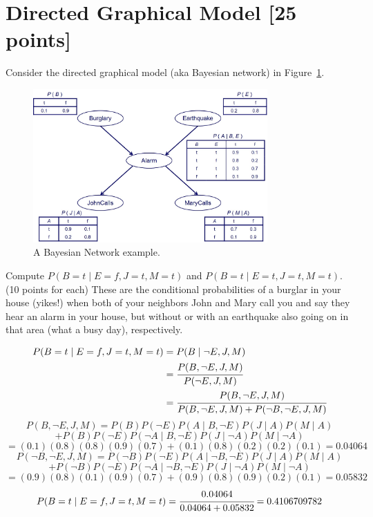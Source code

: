 \documentclass[a4paper]{article}
\theoremstyle{definition}
\newenvironment{soln}{
	\leavevmode\color{blue}\ignorespaces
}{}
\begin{document}
\section{Directed Graphical Model [25 points]}
Consider the directed graphical model (aka Bayesian network) in Figure~\ref{fig:bn}.
\begin{figure}[H]
    \centering
    \includegraphics[width=0.8\textwidth]{BN.jpeg}
    \caption{A Bayesian Network example.}
    \label{fig:bn}
\end{figure}
Compute $P(B=t \mid E=f,J=t,M=t)$ and $P(B=t \mid E=t,J=t,M=t)$. (10 points for each) These are the conditional probabilities of a burglar in your house (yikes!) when both of your neighbors John and Mary call you and say they hear an alarm in your house, but without or with an earthquake also going on in that area (what a busy day), respectively.

\begin{soln}
\begin{equation*}
\begin{split}
P(B=t \mid E=f,J=t,M=t) &= P(B \mid \neg E,J,M) \\
&= \cfrac{P(B, \neg E, J, M)}{P(\neg E, J, M)} \\
&= \cfrac{P(B, \neg E, J, M)}{P(B, \neg E, J, M) + P(\neg B, \neg E, J, M)} \\
\end{split}
\end{equation*}
$$P(B, \neg E, J, M) = P(B)P(\neg E) P(A \mid B, \neg E)P(J \mid A)P(M \mid A)$$
$$+ P(B)P(\neg E) P(\neg A \mid B, \neg E)P(J \mid \neg A)P(M \mid \neg A)$$
$$= (0.1)(0.8)(0.8)(0.9)(0.7) + (0.1)(0.8)(0.2)(0.2)(0.1) = 0.04064$$
$$P(\neg B, \neg E, J, M) = P(\neg B)P(\neg E) P(A \mid \neg B, \neg E)P(J \mid A)P(M \mid A)$$
$$+ P(\neg B)P(\neg E) P(\neg A \mid \neg B, \neg E)P(J \mid \neg A)P(M \mid \neg A)$$
$$= (0.9)(0.8)(0.1)(0.9)(0.7) + (0.9)(0.8)(0.9)(0.2)(0.1) = 0.05832$$
$$P(B=t \mid E=f,J=t,M=t) = \cfrac{0.04064}{0.04064 + 0.05832} = 0.4106709782$$
\end{soln}
\end{document}
